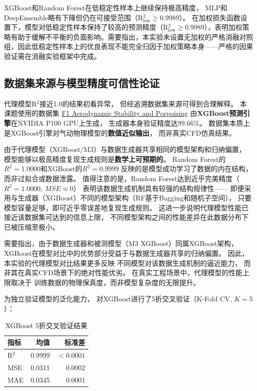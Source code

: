 XGBoost和Random Forest在低稳定性样本上继续保持极高精度，
MLP和DeepEnsemble略有下降但仍在可接受范围（R$^2_{\text{low}} \geq 0.9989$）。
在加权损失函数设置下，模型对低稳定性样本保持了较高的预测精度（R$^2_{\text{low}} \geq 0.9989$），表明加权策略有助于缓解不平衡的负面影响。需要指出，本实验未设置无加权的严格消融对照组，因此低稳定性样本上的优良表现不能完全归因于加权策略本身——严格的因果验证需在消融实验框架中完成。

\subsection{数据集来源与模型精度可信性论证}

代理模型R$^2$接近1.0的结果初看异常，
但经追溯数据集来源可得到合理解释。
本课题使用的数据集
\href{https://www.kaggle.com/datasets/igormerlinicomposer/f1-aerodynamic-stability-and-porpoising-150k-samp/data}{F1 Aerodynamic Stability and Porpoising}
由\textbf{XGBoost预测引擎}在NVIDIA P100 GPU上生成，
生成器本身验证精度达99.66\%。
数据集本质上是XGBoost引擎对气动物理模型的\textbf{数值近似输出}，
而非真实CFD仿真结果。

由于代理模型（XGBoost/M3）与数据生成器共享相同的模型架构和归纳偏置，
模型能够以极高精度复现生成规则是\textbf{数学上可预期的}。
Random Forest的$R^2=1.0000$和XGBoost的$R^2=0.9999$
反映的是模型成功学习了数据的内在结构，
而非过拟合或数据泄露。
值得注意的是，Random Forest达到近乎完美精度（$R^2=1.0000$, $MSE\approx 0$）
表明该数据生成机制具有较强的结构规律性——
即便采用与生成器（XGBoost）不同的模型架构（RF基于Bagging和随机子空间），
只要模型容量足够，即可近乎零误差地复现生成规则。
这进一步说明代理模型性能已接近该数据集可达到的信息上限，
不同模型架构之间的性能差异在此数据分布下已被压缩至极小。

需要指出，由于数据生成器和被测模型（M3 XGBoost）同属XGBoost架构，
XGBoost在模型对比中的优势部分受益于与数据生成器共享的归纳偏置。
因此，本实验的代理模型对比结果更多反映
不同模型对该数据生成机制的逼近能力，
而非其在真实CFD场景下的绝对性能优劣。
在真实工程场景中，代理模型的性能上限取决于
训练数据的物理保真度，而非模型复杂度的无限提升。

为独立验证模型的泛化能力，
对XGBoost进行了5折交叉验证（K-Fold CV, $K=5$）：

\begin{table}[H]
\centering
\caption{XGBoost 5折交叉验证结果}
\begin{tabular}{lrr}
\toprule
指标 & 均值 & 标准差 \\
\midrule
R$^2$ & 0.9999 & $< 0.0001$ \\
MSE & 0.0311 & 0.0002 \\
MAE & 0.0345 & 0.0001 \\
\bottomrule
\end{tabular}
\end{table}

